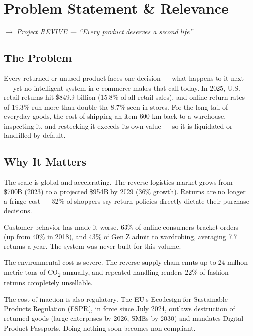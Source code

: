 \documentclass[11pt]{article}
\newcommand{\placeholder}[1]{{\color{placeGray} #1}}
\newcommand{\tip}[1]{{\itshape\color{tipGray} $\rightarrow$ #1}}
\begin{document}
\clearpage
\section{Problem Statement \& Relevance}
\tip{Project REVIVE --- ``Every product deserves a second life''}


\subsection{The Problem}
\placeholder{Every returned or unused product faces one decision --- what happens to it next --- yet no intelligent system in e-commerce makes that call today. In 2025, U.S. retail returns hit \$849.9 billion (15.8\% of all retail sales), and online return rates of 19.3\% run more than double the 8.7\% seen in stores. For the long tail of everyday goods, the cost of shipping an item 600 km back to a warehouse, inspecting it, and restocking it exceeds its own value --- so it is liquidated or landfilled by default.}

\subsection{Why It Matters}
\placeholder{The scale is global and accelerating. The reverse-logistics market grows from \$700B (2023) to a projected \$954B by 2029 (36\% growth). Returns are no longer a fringe cost --- 82\% of shoppers say return policies directly dictate their purchase decisions.}

\placeholder{Customer behavior has made it worse. 63\% of online consumers bracket orders (up from 40\% in 2018), and 43\% of Gen Z admit to wardrobing, averaging 7.7 returns a year. The system was never built for this volume.}

\placeholder{The environmental cost is severe. The reverse supply chain emits up to 24 million metric tons of CO\textsubscript{2} annually, and repeated handling renders 22\% of fashion returns completely unsellable.}

\placeholder{The cost of inaction is also regulatory. The EU's Ecodesign for Sustainable Products Regulation (ESPR), in force since July 2024, outlaws destruction of returned goods (large enterprises by 2026, SMEs by 2030) and mandates Digital Product Passports. Doing nothing soon becomes non-compliant.}
\end{document}
